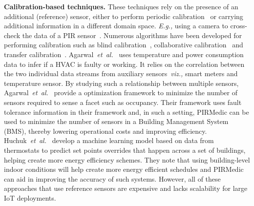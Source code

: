 \documentclass[manuscript]{acmart}
\newcommand{\viz}{{\it viz.,}\xspace}
\newcommand{\Eg}{{\it E.g., }}
\newcommand{\etal}{{\it et~al.}\xspace}
\newcommand{\sol}{{PIRMedic}\xspace}
\begin{document}
\textbf{Calibration-based techniques.} These techniques rely on the presence of an additional (reference) sensor, either to perform periodic calibration~\cite{whitehouse2002calibration, 8405565} or carrying additional information in a different domain space.  \Eg using a camera to cross-check the data of a PIR sensor~\cite{tang2017occupancy}. Numerous algorithms have been developed for performing calibration such as blind calibration~\cite{7472216, 7495010}, collaborative calibration~\cite{10.1145/2737095.2737113, 10.1145/2185677.2185687} and transfer calibration~\cite{article_nose}. Agarwal~\etal~\cite{Agarwal2021ANA} uses temperature and power consumption data to infer if a HVAC is faulty or working. It relies on the correlation between the two individual data streams from auxiliary sensors~\viz smart meters and temperature sensor. By studying such a relationship between multiple sensors, Agarwal~\etal~\cite{Agarwal2022ANA} provide a optimization framework to minimize the number of sensors required to sense a facet such as occupancy. Their framework uses fault tolerance information in their framework and, in such a setting, \sol can be used to minimize the number of sensors in a Building Management System (BMS), thereby lowering operational costs and improving efficiency. Huchuk~\etal~\cite{huchuk2021data} develop a machine learning model based on data from thermostats to predict set points overrides that happen across a set of buildings, helping create more energy efficiency schemes. They note that using building-level indoor conditions will help create more energy efficient schedules and \sol can aid in improving the accuracy of such systems. However, all of these approaches that use reference sensors are expensive and lacks scalability for large IoT deployments. 
\end{document}

